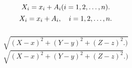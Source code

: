 \documentclass[a4paper,11pt]{article}
\begin{document}
\noindent
{} \\
\Jest
\begin{equation*}
  X_{ i } = x_{ i } + A_{ i } ( i = 1, 2, \ldots, n ).
\end{equation*}
\Powin
\begin{equation*}
  X_{ i } = x_{ i } + A_{ i }, \quad i = 1, 2, \ldots, n.
\end{equation*}
 \\
\Jest
\begin{equation*}
  \sqrt{ ( X - x )^{ 2 } + ( Y - y )^{ 2 } + ( Z - z )^{ 2 } .) }
\end{equation*}
\Powin
\begin{equation*}
  \sqrt{ ( X - x )^{ 2 } + ( Y - y )^{ 2 } + ( Z - z )^{ 2 } }.)
\end{equation*}


\vspace{\spaceTwo}










 {}



\end{document}
